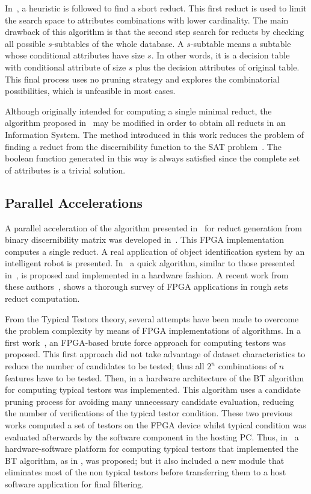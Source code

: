 \documentclass[authoryear,11pt]{elsarticle}
\begin{document}
  
  In~\citep{Lin04}, a heuristic is followed to find a short reduct. This first reduct is used to limit the search
  space to attributes combinations with lower cardinality. The main drawback of this algorithm is that the second
  step search for reducts by checking all possible $s$-subtables of the whole database. A $s$-subtable means a 
  subtable whose conditional attributes have size $s$. In other words, it is a decision table with conditional
  attribute of size $s$ plus the decision attributes of original table. This final process uses no pruning strategy 
  and explores the combinatorial possibilities, which is unfeasible in most cases.
  
  Although originally intended for computing a single minimal reduct, the algorithm proposed in~\citep{Jensen14}
  may be modified in order to obtain all reducts in an Information System. The method introduced in this work
  reduces the problem of finding a reduct from the discernibility function to the SAT problem~\citep{Davis62}. 
  The boolean function generated in this way is always satisfied since the complete set of attributes is a trivial
  solution.
  
\subsection{Parallel Accelerations}

  A parallel acceleration of the algorithm presented in~\citep{Yang08} for reduct generation from binary
  discernibility matrix was developed in~\citep{Tiwari11,Tiwari12}. This FPGA implementation computes a 
  single reduct. A real application of object identification system by an intelligent robot is presented.
  In~\citep{Tiwari13} a quick algorithm, similar to those presented in~\citep{Chouchoulas01}, is proposed
  and implemented in a hardware fashion. A recent work from these authors~\citep{Tiwari14}, shows a thorough
  survey of FPGA applications in rough sets reduct computation.

  From the Typical Testors theory, several attempts have been made to overcome the problem 
  complexity by means of FPGA implementations of algorithms. In a first work~\citep{Cumplido06}, an 
  FPGA-based brute force approach for computing testors was proposed. This first approach did 
  not take advantage of dataset characteristics to reduce the number of candidates to be tested; 
  thus all $2^n$ combinations of $n$ features have to be tested. Then, in \citep{Rojas07} a hardware 
  architecture of the BT algorithm for computing typical testors was implemented. 
  This algorithm uses a candidate pruning process for avoiding many unnecessary candidate evaluation, 
  reducing the number of verifications of the typical testor condition. These two previous works computed 
  a set of testors on the FPGA device whilst typical condition was evaluated afterwards by the 
  software component in the hosting PC. Thus, in~\citep{Rojas12} a hardware-software platform for 
  computing typical testors that implemented the BT algorithm, as in \citep{Rojas07}, was proposed; but it also 
  included a new module that eliminates most of the non typical testors before transferring them to 
  a host software application for final filtering. 
	
\end{document}
